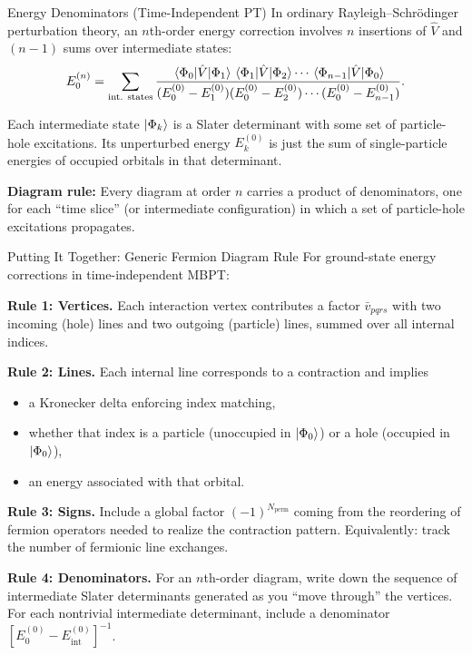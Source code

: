 \documentclass[aspectratio=169]{beamer}
\begin{document}
\begin{frame}{Energy Denominators (Time-Independent PT)}
In ordinary Rayleigh--Schr\"odinger perturbation theory, an $n$th-order
energy correction involves $n$ insertions of $\hat{V}$ and $(n-1)$
sums over intermediate states:
\begin{equation}
E_0^{(n)} =
\sum_{\text{int. states}}
\frac{
\mel{\Phi_0}{\hat{V}}{\Phi_{1}}
\mel{\Phi_{1}}{\hat{V}}{\Phi_{2}}
\cdots
\mel{\Phi_{n-1}}{\hat{V}}{\Phi_0}
}{
(E_0^{(0)}-E_1^{(0)})
(E_0^{(0)}-E_2^{(0)})
\cdots
(E_0^{(0)}-E_{n-1}^{(0)})
}.
\label{eq:EnPert}
\end{equation}

Each intermediate state $\ket{\Phi_k}$ is a Slater determinant with
some set of particle-hole excitations. Its unperturbed energy
$E_k^{(0)}$ is just the sum of single-particle energies of occupied
orbitals in that determinant.

\textbf{Diagram rule:}
Every diagram at order $n$ carries a product of denominators,
one for each ``time slice'' (or intermediate configuration) in which a
set of particle-hole excitations propagates.
\end{frame}

\begin{frame}{Putting It Together: Generic Fermion Diagram Rule}
For ground-state energy corrections in time-independent MBPT:

\textbf{Rule 1: Vertices.}
Each interaction vertex contributes a factor
$\bar{v}_{pqrs}$ with two incoming (hole) lines and two outgoing
(particle) lines, summed over all internal indices.

\textbf{Rule 2: Lines.}
Each internal line corresponds to a contraction and implies
\begin{itemize}
    \item a Kronecker delta enforcing index matching,
    \item whether that index is a particle (unoccupied in $\ket{\Phi_0}$)
    or a hole (occupied in $\ket{\Phi_0}$),
    \item an energy associated with that orbital.
\end{itemize}

\textbf{Rule 3: Signs.}
Include a global factor $(-1)^{N_{\text{perm}}}$ coming from the
reordering of fermion operators needed to realize the contraction pattern.
Equivalently: track the number of fermionic line exchanges.

\textbf{Rule 4: Denominators.}
For an $n$th-order diagram, write down the sequence of intermediate
Slater determinants generated as you ``move through'' the vertices.
For each nontrivial intermediate determinant, include a denominator
$[E_0^{(0)}-E_{\text{int}}^{(0)}]^{-1}$.
\end{frame}
\end{document}
